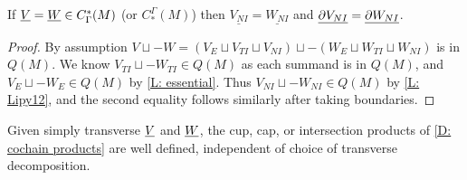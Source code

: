 \begin{lemma}\label{L: same NI}
	If $\underline{V} = \underline{W} \in C^*_\Gamma(M)$ (or $C_*^\Gamma(M)$) then
	$\underline{ V_{NI}} = \underline{ W_{NI}}$ and
	$\underline{\partial V_{NI}} = \underline{\partial W_{NI}}$.
\end{lemma}

\begin{proof}
	By assumption $V\sqcup-W = (V_E \sqcup V_{TI} \sqcup V_{NI}) \sqcup -(W_E \sqcup W_{TI} \sqcup W_{NI})$ is in $Q(M)$.
	We know $V_{TI} \sqcup -W_{TI} \in Q(M)$ as each summand is in $Q(M)$, and $V_E \sqcup -W_E \in Q(M)$ by \cref{L: essential}.
	Thus $V_{NI} \sqcup -W_{NI} \in Q(M)$ by \cref{L: Lipy12}, and the second equality follows similarly after taking boundaries.
\end{proof}

\begin{theorem}\label{T: cochain product}
	Given simply transverse $\underline{V}$ and $\underline{W}$, the cup, cap, or intersection products of \cref{D: cochain products} are well defined, independent of choice of transverse decomposition.
\end{theorem}

